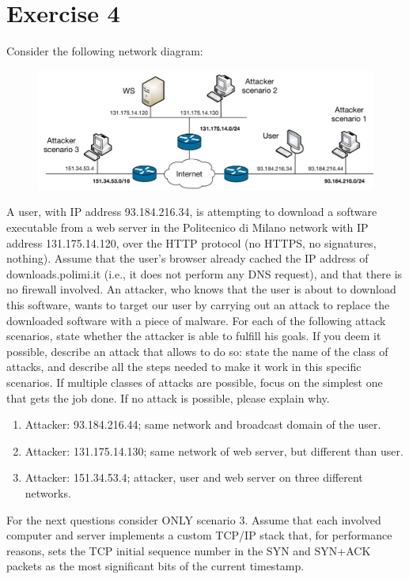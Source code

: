 \section{Exercise 4}

Consider the following network diagram:
\begin{figure}[H]
    \centering
    \includegraphics[width=0.75\linewidth]{images/net1.png}
\end{figure}
A user, with IP address 93.184.216.34, is attempting to download a software executable from a web server in the Politecnico di Milano network with IP address 131.175.14.120, over the HTTP protocol (no HTTPS, no signatures, nothing).
Assume that the user's browser already cached the IP address of downloads.polimi.it (i.e., it does not perform any DNS request), and that there is no firewall involved. 
An attacker, who knows that the user is about to download this software, wants to target our user by carrying out an attack to replace the downloaded software with a piece of malware.
For each of the following attack scenarios, state whether the attacker is able to fulfill his goals. 
If you deem it possible, describe an attack that allows to do so: state the name of the class of attacks, and describe all the steps needed to make it work in this specific scenarios. 
If multiple classes of attacks are possible, focus on the simplest one that gets the job done. 
If no attack is possible, please explain why.
\begin{enumerate}
    \item Attacker: 93.184.216.44; same network and broadcast domain of the user. 
    \item Attacker: 131.175.14.130; same network of web server, but different than user. 
    \item Attacker: 151.34.53.4; attacker, user and web server on three different networks. 
\end{enumerate}
For the next questions consider ONLY scenario 3. 
Assume that each involved computer and server implements a custom TCP/IP stack that, for performance reasons, sets the TCP initial sequence number in the SYN and SYN+ACK packets as the most significant bits of the current timestamp.
